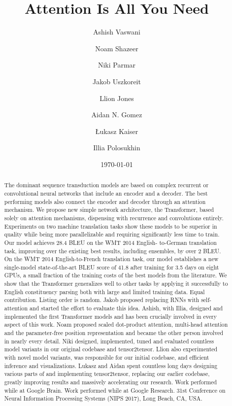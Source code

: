 \documentclass[12pt, a4paper]{article}
\title{Attention Is All You Need}
\author{Ashish Vaswani \and Noam Shazeer \and Niki Parmar \and Jakob Uszkoreit \and Llion Jones \and Aidan N. Gomez \and Łukasz Kaiser \and Illia Polosukhin}
\date{\today}
\begin{document}
\maketitle

\begin{abstract}
The dominant sequence transduction models are based on complex recurrent or convolutional neural networks that include an encoder and a decoder. The best performing models also connect the encoder and decoder through an attention mechanism. We propose new simple network architecture, the Transformer, based solely on attention mechanisms, dispensing with recurrence and convolutions entirely. Experiments on two machine translation tasks show these models to be superior in quality while being more parallelizable and requiring significantly less time to train. Our model achieves 28.4 BLEU on the WMT 2014 English- to-German translation task, improving over the existing best results, including ensembles, by over 2 BLEU. On the WMT 2014 English-to-French translation task, our model establishes a new single-model state-of-the-art BLEU score of 41.8 after training for 3.5 days on eight GPUs, a small fraction of the training costs of the best models from the literature. We show that the Transformer generalizes well to other tasks by applying it successfully to English constituency parsing both with large and limited training data. Equal contribution. Listing order is random. Jakob proposed replacing RNNs with self-attention and started the effort to evaluate this idea. Ashish, with Illia, designed and implemented the first Transformer models and has been crucially involved in every aspect of this work. Noam proposed scaled dot-product attention, multi-head attention and the parameter-free position representation and became the other person involved in nearly every detail. Niki designed, implemented, tuned and evaluated countless model variants in our original codebase and tensor2tensor. Llion also experimented with novel model variants, was responsible for our initial codebase, and efficient inference and visualizations. Lukasz and Aidan spent countless long days designing various parts of and implementing tensor2tensor, replacing our earlier codebase, greatly improving results and massively accelerating our research. Work performed while at Google Brain. Work performed while at Google Research. 31st Conference on Neural Information Processing Systems (NIPS 2017), Long Beach, CA, USA.
\end{abstract}

\tableofcontents
\newpage
\end{document}
